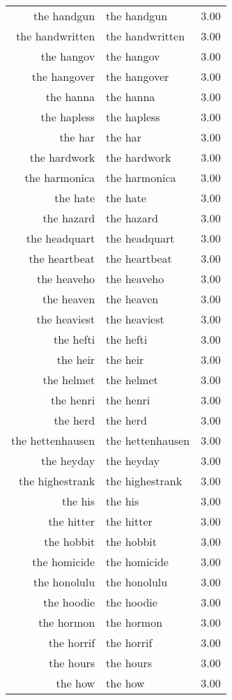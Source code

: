 \begin{table}[ht]
\begin{tabular}{rlr}
  the handgun & the handgun & 3.00 \\ 
  the handwritten & the handwritten & 3.00 \\ 
  the hangov & the hangov & 3.00 \\ 
  the hangover & the hangover & 3.00 \\ 
  the hanna & the hanna & 3.00 \\ 
  the hapless & the hapless & 3.00 \\ 
  the har & the har & 3.00 \\ 
  the hardwork & the hardwork & 3.00 \\ 
  the harmonica & the harmonica & 3.00 \\ 
  the hate & the hate & 3.00 \\ 
  the hazard & the hazard & 3.00 \\ 
  the headquart & the headquart & 3.00 \\ 
  the heartbeat & the heartbeat & 3.00 \\ 
  the heaveho & the heaveho & 3.00 \\ 
  the heaven & the heaven & 3.00 \\ 
  the heaviest & the heaviest & 3.00 \\ 
  the hefti & the hefti & 3.00 \\ 
  the heir & the heir & 3.00 \\ 
  the helmet & the helmet & 3.00 \\ 
  the henri & the henri & 3.00 \\ 
  the herd & the herd & 3.00 \\ 
  the hettenhausen & the hettenhausen & 3.00 \\ 
  the heyday & the heyday & 3.00 \\ 
  the highestrank & the highestrank & 3.00 \\ 
  the his & the his & 3.00 \\ 
  the hitter & the hitter & 3.00 \\ 
  the hobbit & the hobbit & 3.00 \\ 
  the homicide & the homicide & 3.00 \\ 
  the honolulu & the honolulu & 3.00 \\ 
  the hoodie & the hoodie & 3.00 \\ 
  the hormon & the hormon & 3.00 \\ 
  the horrif & the horrif & 3.00 \\ 
  the hours & the hours & 3.00 \\ 
  the how & the how & 3.00 \\ 

\end{tabular}
\end{table}
